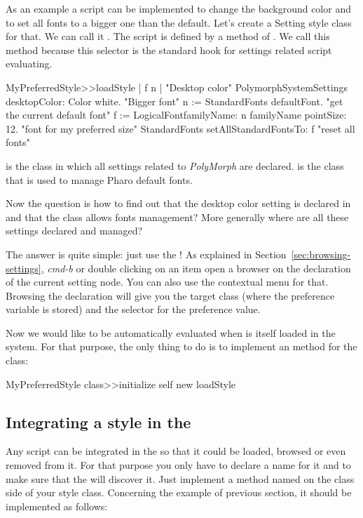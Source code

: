 \documentclass[a4paper,10pt,twoside]{book}
\begin{document}
{As an example a script can be implemented to change the background color and to set all fonts to a bigger one than the default. Let's create a Setting style class for that. We can call it . The script is defined by a method of . We call this method  because this selector is the standard hook for settings related script evaluating. 

\begin{code}{}
MyPreferredStyle>>loadStyle
	| f n |
	"Desktop color"
	PolymorphSystemSettings desktopColor: Color white.
	"Bigger font"
	n := StandardFonts defaultFont. "get the current default font"
	f := LogicalFontfamilyName: n familyName pointSize: 12. "font for my preferred size"
	StandardFonts setAllStandardFontsTo: f "reset all fonts"
\end{code}
 is the class in which all settings related to \textit{PolyMorph} are declared.  is the class that is used to manage Pharo default fonts.

Now the question is how to find out that the desktop color setting is declared in  and that the  class allows fonts management? More generally where are all these settings declared and managed? 

The answer is quite simple: just use the \setbrowser! As explained in Section~\ref{sec:browsing-settings}, \textit{cmd-b} or double clicking on an item open a browser on the declaration of the current setting node. You can also use the contextual menu for that. Browsing the declaration will give you the target class (where the preference variable is stored) and the selector for the preference value.

Now we would like  to be automatically evaluated when  is itself loaded in the system. For that purpose, the only thing to do is to implement an  method for the  class:
\begin{code}{}
MyPreferredStyle class>>initialize
	self new loadStyle
\end{code}

\subsection{Integrating a style in the \setbrowser}
Any script can be integrated in the \setbrowser so that it could be loaded, browsed or even removed from it. For that purpose you only have to declare a name for it and to make sure that the \setbrowser will discover it. Just implement a method named  on the class side of your style class. Concerning the example of previous section, it should be implemented as follows:

}
\end{document}
